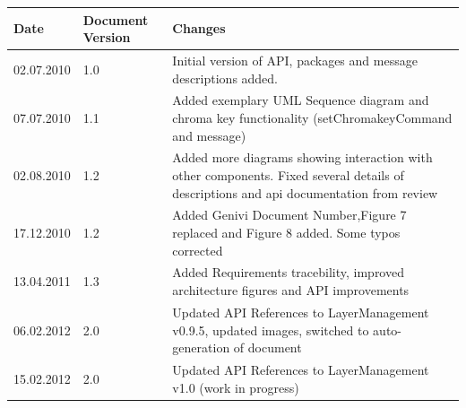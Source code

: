 \documentclass[a4paper]{article}
\begin{document}
\begin{titlepage}
\begin{tabular}{ | l | l | p{9.5cm} | }
\hline
Date & Document Version & Changes \\
\hline
02.07.2010 & 1.0 & Initial version of API, packages and message descriptions added. \\
\hline
07.07.2010 & 1.1 & Added exemplary UML Sequence diagram and chroma key functionality (setChromakeyCommand and message) \\
\hline
02.08.2010 & 1.2 & Added more diagrams showing interaction with other components. Fixed several details of descriptions and api documentation from review \\
\hline
17.12.2010 & 1.2 & Added Genivi Document Number,Figure 7 replaced and Figure 8 added. Some typos corrected \\
\hline
13.04.2011 & 1.3 & Added Requirements tracebility, improved architecture figures and API improvements \\
\hline
06.02.2012 & 2.0 & Updated API References to LayerManagement v0.9.5, updated images, switched to auto-generation of document \\
\hline
15.02.2012 & 2.0 & Updated API References to LayerManagement v1.0 (work in progress) \\
\hline
\end{tabular}


\end{titlepage}
\clearemptydoublepage
{}
\tableofcontents
\clearemptydoublepage
{}
\hypersetup{pageanchor=true}
\end{document}

